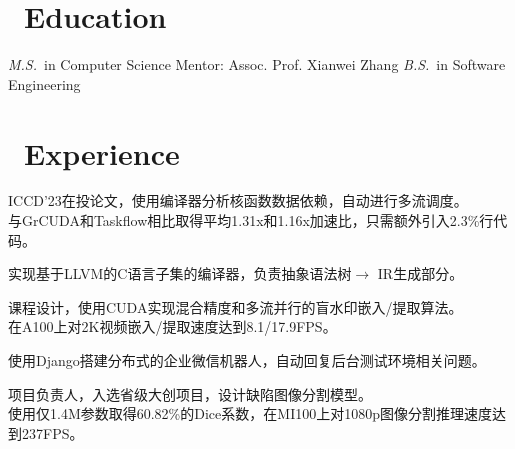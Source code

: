 \documentclass{resume}
\begin{document}


 
\section{\faGraduationCap\  Education}
\textit{M.S.}\ in Computer Science \qquad Mentor: Assoc. Prof. Xianwei Zhang
\textit{B.S.}\ in Software Engineering

\section{\faUsers\ Experience}

ICCD'23在投论文，使用编译器分析核函数数据依赖，自动进行多流调度。\\与GrCUDA和Taskflow相比取得平均1.31x和1.16x加速比，只需额外引入2.3\%行代码。

\vspace*{0.3em}
实现基于LLVM的C语言子集的编译器，负责抽象语法树$\to$ IR生成部分。

\vspace*{0.3em}
课程设计，使用CUDA实现混合精度和多流并行的盲水印嵌入/提取算法。\\在A100上对2K视频嵌入/提取速度达到8.1/17.9FPS。

\vspace*{0.3em}
使用Django搭建分布式的企业微信机器人，自动回复后台测试环境相关问题。

\vspace*{0.3em}
项目负责人，入选省级大创项目，设计缺陷图像分割模型。\\使用仅1.4M参数取得60.82\%的Dice系数，在MI100上对1080p图像分割推理速度达到237FPS。
\end{document}
